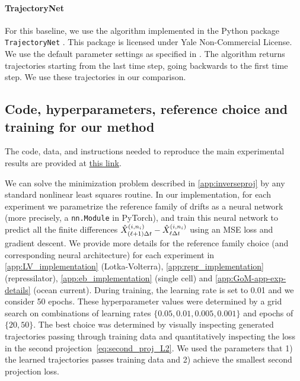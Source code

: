 \paragraph{TrajectoryNet}
\label{app:trajnetdetails}
For this baseline, we use the algorithm implemented in the Python package \texttt{TrajectoryNet} \citep{trajnet}. This package is licensed under Yale Non-Commercial License. We use the default parameter settings as specified in \citet{tong2020trajectorynet}. The algorithm returns trajectories starting from the last time step, going backwards to the first time step. We use these trajectories in our comparison. 


\subsection{Code, hyperparameters, reference choice and training for our method}
\label{app:train-hyperparams-ref}

The code, data, and instructions needed to reproduce the main experimental results are provided at 
\href{https://github.com/YunyiShen/SB-Iterative-Reference-Refinement}{this link}.

We can solve the minimization problem described in \cref{app:inverseproj} by any standard nonlinear least squares routine. In our implementation, for each experiment we parametrize the reference family of drifts as a neural network (more precisely, a \texttt{nn.Module} in PyTorch), and train this neural network to predict all the finite differences $\simulatedresponseat{(\ell+1) \Delta \timet}^{ (\timeidx,\sampleidx_{\timeidx}) }-\simulatedresponseat{\ell \Delta \timet}^{ (\timeidx,\sampleidx_{\timeidx}) }$ using an MSE loss and gradient descent.  We provide more details for the reference family choice (and corresponding neural architecture) for each experiment in \cref{app:LV_implementation} (Lotka-Volterra), \cref{app:repr_implementation} (repressilator), \cref{app:eb_implementation} (single cell) and  \cref{app:GoM-app-exp-details} (ocean current). During training, the learning rate is set to 0.01 and we consider 50 epochs. These hyperparameter values were determined by a grid search on combinations of learning rates $\{0.05, 0.01, 0.005, 0.001\}$ and epochs of $\{20, 50\}$. The best choice was determined by visually inspecting generated trajectories passing through training data and quantitatively inspecting the loss in the second projection~\cref{eq:second_proj_L2}. We used the parameters that 1) the learned trajectories passes training data and 2) achieve the smallest second projection loss. 

